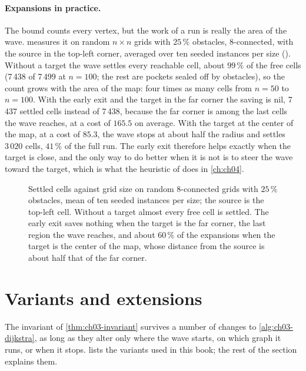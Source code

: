 \paragraph{Expansions in practice.} The bound counts every vertex, but the work of a run is
really the area of the wave.  measures it on random $n\times n$ grids
with $25\,\%$ obstacles, 8-connected, with the source in the top-left corner, averaged over ten
seeded instances per size (). Without a target the
wave settles every reachable cell, about $99\,\%$ of the free cells (7\,438 of 7\,499 at
$n=100$; the rest are pockets sealed off by obstacles), so the count grows with the area of the
map: four times as many cells from $n=50$ to $n=100$. With the early exit and the target in the
far corner the saving is nil, 7\,437 settled cells instead of 7\,438, because the far corner is
among the last cells the wave reaches, at a cost of $165.5$ on average. With the target at the
center of the map, at a cost of $85.3$, the wave stops at about half the radius and settles
$3\,020$ cells, $41\,\%$ of the full run. The early exit therefore helps exactly when the
target is close, and the only way to do better when it is not is to steer the wave toward the
target, which is what the heuristic of \astar does in \cref{ch:ch04}.

\begin{figure}[tb]
  \centering
  \caption{Settled cells against grid size on random 8-connected grids with $25\,\%$ obstacles,
mean of ten seeded instances per size; the source is the top-left cell. Without a target almost
every free cell is settled. The early exit saves nothing when the target is the far corner,
the last region the wave reaches, and about $60\,\%$ of the expansions when the target is the
center of the map, whose distance from the source is about half that of the far corner.}
  \label{fig:ch03-expansions}
\end{figure}

\section{Variants and extensions}
\label{sec:ch03-variants}

The invariant of \cref{thm:ch03-invariant} survives a number of changes to
\cref{alg:ch03-dijkstra}, as long as they alter only where the wave starts, on which graph it
runs, or when it stops.  lists the variants used in this book; the rest
of the section explains them.

